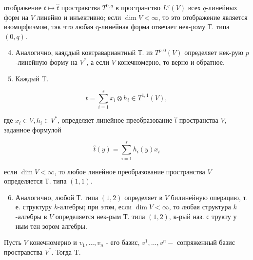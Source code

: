 \documentclass[10pt]{article}
\begin{document}
отображение $t \longmapsto \hat{t}$ простравства $T^{0, q}$ в пространство $L^{q}(V)$ всех $q$-линейных форм на $V$ линейно и инъективно; если $\operatorname{dim} V<\infty$, то это отображение является изоморфизмом, так что любая q-линейная форма отвечает нек-рому Т. типа $(0, q)$.



\begin{enumerate}

  \setcounter{enumi}{3}

  \item Аналогично, каяддый ковтравариантный Т. из $T^{p, 0}(V)$ определяет нек-рую $p$-линейную форму на $V^{*}$, а если $V$ конечномерно, то верно и обратное.



  \item Каждый $\mathrm{T}$.



\end{enumerate}



\[

t=\sum_{i=1}^{s} x_{i} \otimes h_{i} \in T^{1,1}(V),

\]



где $x_{i} \in V, h_{i} \in V^{*}$, определяет линейное преобразование $\hat{t}$ пространства $V$, заданное формулой



\[

\hat{t}(y)=\sum_{i=1}^{s} h_{i}(y) x_{i}

\]



если $\operatorname{dim} V<\infty$, то любое линейное преобразование пространства $V$ определяется Т. типа $(1,1)$.



\begin{enumerate}

  \setcounter{enumi}{5}

  \item Аналогично, любой Т. типа $(1,2)$ определяет в $V$ билинейную операцию, т. е. структуру $k$-алгебры; при этом, если $\operatorname{dim} V<\infty$, то любая структура $k$-алгебры в $V$ определяется нек-рым Т. типа $(1,2)$, к-рый наз. с трукту у ным тен зором алгебры.

\end{enumerate}



Пусть $V$ конечномерно и $v_{1}, \ldots, v_{n}$ - его базис, $v^{1}, \ldots, v^{n}-$ сопряженный базис простравства $V^{*}$. Тогда $\mathrm{T}$.
\end{document}
